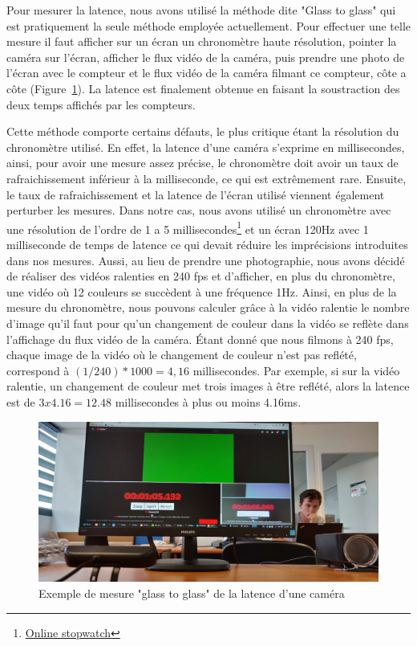 Pour mesurer la latence, nous avons utilisé la méthode dite "Glass to glass" qui est pratiquement la seule méthode employée actuellement. Pour effectuer une telle mesure il faut afficher sur un écran un chronomètre haute résolution, pointer la caméra sur l'écran, afficher le flux vidéo de la caméra, puis prendre une photo de l'écran avec le compteur et le flux vidéo de la caméra filmant ce compteur, côte a côte (Figure~\ref{fig:latency:glasstoglass}). La latence est finalement obtenue en faisant la soustraction des deux temps affichés par les compteurs. 

Cette méthode comporte certains défauts, le plus critique étant la résolution du chronomètre utilisé. En effet, la latence d'une caméra s'exprime en millisecondes, ainsi, pour avoir une mesure assez précise, le chronomètre doit avoir un taux de rafraichissement inférieur à la milliseconde, ce qui est extrêmement rare. Ensuite, le taux de rafraichissement et la latence de l'écran utilisé viennent également perturber les mesures. Dans notre cas, nous avons utilisé un chronomètre avec une résolution de l'ordre de 1 a 5 millisecondes\footnote{\href{https://stopwatch.onlineclock.net/}{Online stopwatch}} et un écran 120Hz avec 1 milliseconde de temps de latence ce qui devait réduire les imprécisions introduites dans nos mesures. Aussi, au lieu de prendre une photographie, nous avons décidé de réaliser des vidéos ralenties en 240 fps et d'afficher, en plus du chronomètre, une vidéo où 12 couleurs se succèdent à une fréquence 1Hz. Ainsi, en plus de la mesure du chronomètre, nous pouvons calculer grâce à la vidéo ralentie le nombre d'image qu'il faut pour qu'un changement de couleur dans la vidéo se reflète dans l'affichage du flux vidéo de la caméra. Étant donné que nous filmons à 240 fps, chaque image de la vidéo où le changement de couleur n'est pas reflété, correspond à $(1/240) * 1000 = 4,16$ millisecondes. Par exemple, si sur la vidéo ralentie, un changement de couleur met trois images à être reflété, alors la latence est de $3 x 4.16 = 12.48$ millisecondes à plus ou moins 4.16ms.

\begin{figure}[H]
\centering
\includegraphics[width=\linewidth]{images/glasstoglass}
\caption{Exemple de mesure "glass to glass" de la latence d'une caméra}
\label{fig:latency:glasstoglass}
\end{figure}

